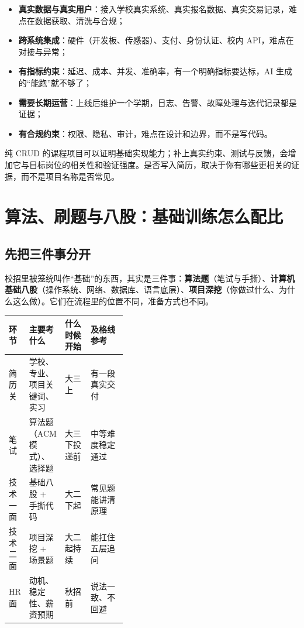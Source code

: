 \documentclass[UTF8,zihao=5,openany]{ctexbook}
\begin{document}
\begin{itemize}
\item \textbf{真实数据与真实用户}：接入学校真实系统、真实报名数据、真实交易记录，难点在数据获取、清洗与合规；
\item \textbf{跨系统集成}：硬件（开发板、传感器）、支付、身份认证、校内 API，难点在对接与异常；
\item \textbf{有指标约束}：延迟、成本、并发、准确率，有一个明确指标要达标，AI 生成的“能跑”就不够了；
\item \textbf{需要长期运营}：上线后维护一个学期，日志、告警、故障处理与迭代记录都是证据；
\item \textbf{有合规约束}：权限、隐私、审计，难点在设计和边界，而不是写代码。
\end{itemize}

纯 CRUD 的课程项目可以证明基础实现能力；补上真实约束、测试与反馈，会增加它与目标岗位的相关性和验证强度。是否写入简历，取决于你有哪些更相关的证据，而不是项目名称是否常见。


\section{算法、刷题与八股：基础训练怎么配比}
\subsection{先把三件事分开}
校招里被笼统叫作“基础”的东西，其实是三件事：\textbf{算法题}（笔试与手撕）、\textbf{计算机基础八股}（操作系统、网络、数据库、语言底层）、\textbf{项目深挖}（你做过什么、为什么这么做）。它们在流程里的位置不同，准备方式也不同。

\begin{center}\small
\begin{tabularx}{\linewidth}{p{0.16\linewidth}p{0.24\linewidth}YY}
\toprule
环节 & 主要考什么 & 什么时候开始 & 及格线参考 \\
\midrule
简历关 & 学校、专业、项目关键词、实习 & 大三上 & 有一段真实交付 \\
笔试 & 算法题（ACM 模式）、选择题 & 大三下投递前 & 中等难度稳定通过 \\
技术一面 & 基础八股 + 手撕代码 & 大二下起 & 常见题能讲清原理 \\
技术二面 & 项目深挖 + 场景题 & 大二起持续 & 能扛住五层追问 \\
HR 面 & 动机、稳定性、薪资预期 & 秋招前 & 说法一致、不回避 \\
\bottomrule
\end{tabularx}
\end{center}
\end{document}
